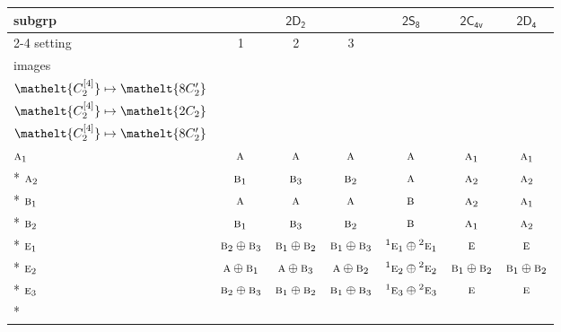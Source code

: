 \documentclass[10pt,a4paper]{article}
\numberwithin{equation}{section}
\newcommand{\eltfont}[1]{{\let\sigma\eltsigma\mathelt{#1}}}
\newcommand{\grp}[1]{\mathsf{#1}}
\newcommand{\irr}[1]{\text{\normalfont\scshape #1}}
\newcommand{\conjpair}[1]{{}^{#1}}
\newcommand{\cls}[1]{\eltfont{#1}}
\newcommand{\genidx}[2]{#1^{[\mathrm{#2}]}}
\begin{document}
{\small\begin{longtable}{@{}lcccccc@{}}\toprule
subgrp & \multicolumn{3}{c}{\href{2D2.pdf}{$\grp{2D_{2}}$}} & \href{2S8.pdf}{$\grp{2S_{8}}$} & \href{2C4v.pdf}{$\grp{2C_{4v}}$} & \href{2D4.pdf}{$\grp{2D_{4}}$}\\\cmidrule(lr){2-4}
setting & 1 & 2 & 3 &  &  & \\
images & {\scriptsize\begin{tabular}[t]{@{}c@{}}$\cls{\genidx{C_{2}}{2}} \mapsto \cls{2C_{2}}$\\$\cls{\genidx{C_{2}}{4}} \mapsto \cls{8C_{2}'}$\end{tabular}} & {\scriptsize\begin{tabular}[t]{@{}c@{}}$\cls{\genidx{C_{2}}{2}} \mapsto \cls{8C_{2}'}$\\$\cls{\genidx{C_{2}}{4}} \mapsto \cls{2C_{2}}$\end{tabular}} & {\scriptsize\begin{tabular}[t]{@{}c@{}}$\cls{\genidx{C_{2}}{2}} \mapsto \cls{8C_{2}'}$\\$\cls{\genidx{C_{2}}{4}} \mapsto \cls{8C_{2}'}$\end{tabular}} &  &  & \\\midrule\endhead
\bottomrule\endfoot\endlastfoot
$\irr{a}_{1}$ & $\irr{a}$ & $\irr{a}$ & $\irr{a}$ & $\irr{a}$ & $\irr{a}_{1}$ & $\irr{a}_{1}$\\*
$\irr{a}_{2}$ & $\irr{b}_{1}$ & $\irr{b}_{3}$ & $\irr{b}_{2}$ & $\irr{a}$ & $\irr{a}_{2}$ & $\irr{a}_{2}$\\*
$\irr{b}_{1}$ & $\irr{a}$ & $\irr{a}$ & $\irr{a}$ & $\irr{b}$ & $\irr{a}_{2}$ & $\irr{a}_{1}$\\*
$\irr{b}_{2}$ & $\irr{b}_{1}$ & $\irr{b}_{3}$ & $\irr{b}_{2}$ & $\irr{b}$ & $\irr{a}_{1}$ & $\irr{a}_{2}$\\*
$\irr{e}_{1}$ & $\irr{b}_{2}\oplus \irr{b}_{3}$ & $\irr{b}_{1}\oplus \irr{b}_{2}$ & $\irr{b}_{1}\oplus \irr{b}_{3}$ & $\conjpair{1}\irr{e}_{1}\oplus \conjpair{2}\irr{e}_{1}$ & $\irr{e}$ & $\irr{e}$\\*
$\irr{e}_{2}$ & $\irr{a}\oplus \irr{b}_{1}$ & $\irr{a}\oplus \irr{b}_{3}$ & $\irr{a}\oplus \irr{b}_{2}$ & $\conjpair{1}\irr{e}_{2}\oplus \conjpair{2}\irr{e}_{2}$ & $\irr{b}_{1}\oplus \irr{b}_{2}$ & $\irr{b}_{1}\oplus \irr{b}_{2}$\\*
$\irr{e}_{3}$ & $\irr{b}_{2}\oplus \irr{b}_{3}$ & $\irr{b}_{1}\oplus \irr{b}_{2}$ & $\irr{b}_{1}\oplus \irr{b}_{3}$ & $\conjpair{1}\irr{e}_{3}\oplus \conjpair{2}\irr{e}_{3}$ & $\irr{e}$ & $\irr{e}$\\*

\end{longtable}}
\end{document}
